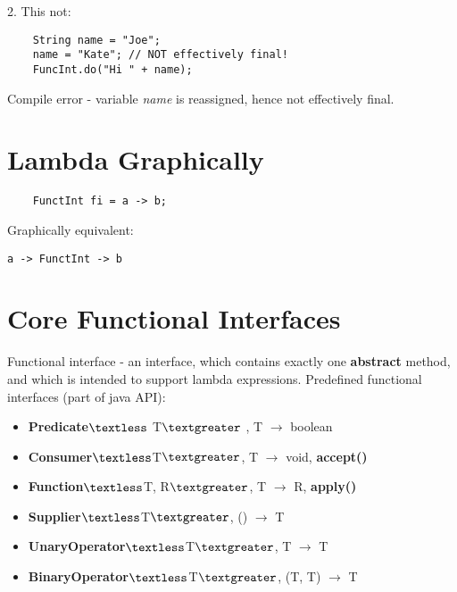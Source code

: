 \documentclass{report}
\begin{document}
2. This not:
\begin{verbatim}
	String name = "Joe";
	name = "Kate"; // NOT effectively final!
	FuncInt.do("Hi " + name);
\end{verbatim}
Compile error - variable \textit{name} is reassigned, hence not effectively final.

\section{Lambda Graphically}
\begin{verbatim}
	FunctInt fi = a -> b;
\end{verbatim}

Graphically equivalent:
\begin{verbatim}
a -> FunctInt -> b
\end{verbatim}

\section{Core Functional Interfaces}

Functional interface - an interface, which contains exactly one \textbf{abstract} method, and which is intended to support lambda expressions. Predefined functional interfaces (part of java API):
\begin{itemize}
	\item \textbf{Predicate}$\textless$ T$\textgreater$ , T  $\rightarrow$ boolean
	\item \textbf{Consumer}$\textless$T$\textgreater$, T  $\rightarrow$ void, \textbf{accept()}
	\item \textbf{Function}$\textless$T, R$\textgreater$, T $\rightarrow$ R, \textbf{apply()}
	\item \textbf{Supplier}$\textless$T$\textgreater$, () $\rightarrow$ T
	\item \textbf{UnaryOperator}$\textless$T$\textgreater$, T $\rightarrow$ T
	\item  \textbf{BinaryOperator}$\textless$T$\textgreater$, (T, T)  $\rightarrow$ T
\end{itemize}
\end{document}
